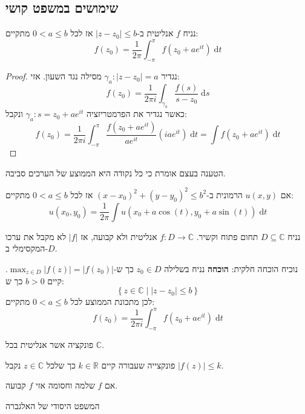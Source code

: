 \documentclass{tstextbook}
\begin{document}
\subsection{שימושים במשפט קושי}

\begin{proposition}
נניח \(f\) אנליטית ב-\(\lvert z-z_{0} \rvert\leq b\) אז לכל \(0<a\leq b\) מתקיים:
$$f(z_{0})=\frac{1}{2\pi}\int_{-\pi}^{\pi} f(z_{0}+ae^{ it })\;\mathrm{d}t$$

\end{proposition}
\begin{proof}
נגדיר \(\gamma_{a}:|z-z_{0}|=a\) מסילה נגד השעון. אזי:
$$f(z_{0})=\frac{1}{2\pi i}\int_{\gamma_{a}} \frac{f(s)}{s-z_{0}} \;\mathrm{d}s $$
כאשר נגדיר את הפרמטריזציה \(\gamma_{a}:s=z_{0}+ae^{ it }\) ונקבל:
$$f(z_{0})=\frac{1}{2\pi i} \int_{-\pi}^{\pi} \frac{f(z_{0}+ae^{ it })}{ae^{ it }}(iae^{ it })\;\mathrm{d}t=\int f(z_{0}+ae^{ it }) \;\mathrm{d} t $$

\end{proof}
הטענה בעצם אומרת כי כל נקודה היא הממוצע של הערכים סביבה.

\begin{corollary}
אם \(u(x,y)\) הרמונית ב-\((x-x_{0})^{2}+(y-y_{0})^{2}\leq b^{2}\) אז לכל \(0<a\leq b\) מתקיים:
$$u(x_{0},y_{0})=\frac{1}{2\pi}\int u\left( x_{0}+a\cos(t),y_{0}+a\sin(t) \right) \;\mathrm{d} t $$

\end{corollary}
\begin{proposition}
נניח \(D\subseteq \mathbb{C}\) תחום פתוח וקשיר. \(f:D\to \mathbb{C}\) אנליטית ולא קבועה, אז \(\lvert f \rvert\) לא מקבל את ערכו המקסימלי ב-\(D\).

\end{proposition}
נוכיח הוכחה חלקית:
\textbf{הוכחה}
נניח בשלילה \(z_{0} \in D\) כך ש-\(\max_{z \in D}\lvert f(z) \rvert=\lvert f(z_{0}) \rvert\). קיים \(b>0\) כך ש:
$$\left\{  z \in \mathbb{C} \mid |z-z_{0}|\leq b  \right\}$$
לכן מתכונת הממוצע לכל \(0<a\leq b\) מתקיים:
$$f(z_{0})=\frac{1}{2\pi i} \int_{-\pi}^{\pi}f(z_{0}+ae^{ it })\;\mathrm{d}t$$

\begin{definition}
פונקציה אשר אנליטית בכל \(\mathbb{C}\).

\end{definition}
\begin{definition}
פונקצייה שעבורה קיים \(k \in \mathbb{R}\) כך שלכל \(z \in \mathbb{C}\) נקבל \(\left\lvert  f(z)  \right\rvert\leq k\).

\end{definition}
\begin{theorem}[ליוביל]
אם \(f\) שלמה וחסומה אזי \(f\) קבועה.

\end{theorem}
\begin{corollary}
המשפט היסודי של האלגברה

\end{corollary}
\end{document}
